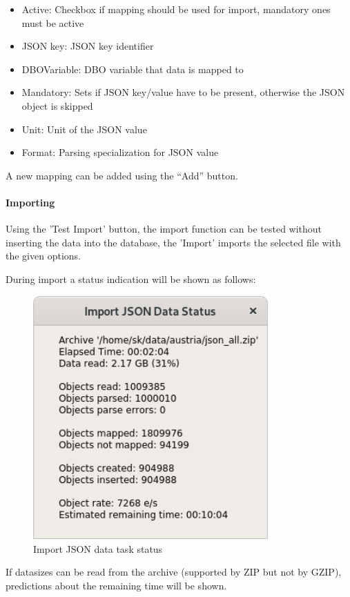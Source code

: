 {\begin{itemize}  
\item Active: Checkbox if mapping should be used for import, mandatory ones must be active
\item JSON key: JSON key identifier
\item DBOVariable: DBO variable that data is mapped to
\item Mandatory: Sets if JSON key/value have to be present, otherwise the JSON object is skipped
\item Unit: Unit of the JSON value
\item Format: Parsing specialization for JSON value
\end{itemize}

A new mapping can be added using the ``Add'' button.

\paragraph{Importing}
Using the 'Test Import' button, the import function can be tested without inserting the data into the database, the 'Import' imports the selected file with the given options.

During import a status indication will be shown as follows:

\begin{figure}[H]
  \center
    \includegraphics[width=9cm,frame]{../screenshots/json_import_status.png}
  \caption{Import JSON data task status}
\end{figure}

If datasizes can be read from the archive (supported by ZIP but not by GZIP), predictions about the remaining time will be shown.

}
